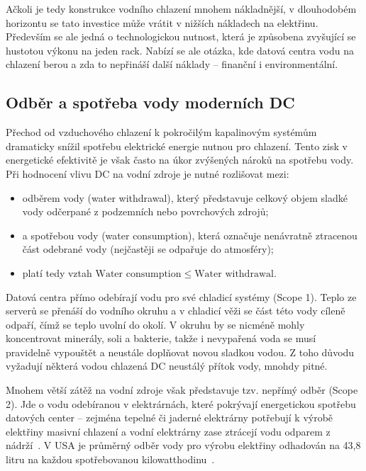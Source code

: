 Ačkoli je tedy konstrukce vodního chlazení mnohem nákladnější, v dlouhodobém horizontu se tato investice může vrátit v nižších nákladech na elektřinu. Především se ale jedná o technologickou nutnost, která je způsobena zvyšující se hustotou výkonu na jeden rack. Nabízí se ale otázka, kde datová centra vodu na chlazení berou a zda to nepřináší další náklady -- finanční i environmentální.

\subsection{Odběr a spotřeba vody moderních DC}
\label{subsec:voda}

Přechod od vzduchového chlazení k pokročilým kapalinovým systémům dramaticky snížil spotřebu elektrické energie nutnou pro chlazení. Tento zisk v energetické efektivitě je však často na úkor zvýšených nároků na spotřebu vody. Při hodnocení vlivu DC na vodní zdroje je nutné rozlišovat mezi:

\begin{itemize}
    \item odběrem vody (water withdrawal), který představuje celkový objem sladké vody odčerpané z podzemních nebo povrchových zdrojů;
    \item a spotřebou vody (water consumption), která označuje nenávratně ztracenou část odebrané vody (nejčastěji se odpařuje do atmosféry);~\cite{li_making_2025}
    \item platí tedy vztah $\text{Water consumption} \le \text{Water withdrawal}.$
\end{itemize}

Datová centra přímo odebírají vodu pro své chladicí systémy (Scope 1). Teplo ze serverů se přenáší do vodního okruhu a v chladicí věži se část této vody cíleně odpaří, čímž se teplo uvolní do okolí. V okruhu by se nicméně mohly koncentrovat minerály, soli a bakterie, takže i nevypařená voda se musí pravidelně vypouštět a neustále doplňovat novou sladkou vodou. Z toho důvodu vyžadují některá vodou chlazená DC neustálý přítok vody, mnohdy pitné.~\cite{li_making_2025}

Mnohem větší zátěž na vodní zdroje však představuje tzv. nepřímý odběr (Scope 2). Jde o vodu odebíranou v elektrárnách, které pokrývají energetickou spotřebu datových center -- zejména tepelné či jaderné elektrárny potřebují k výrobě elektřiny masivní chlazení a vodní elektrárny zase ztrácejí vodu odparem z nádrží~\cite{li_making_2025, LBNL-2001637}. V USA je průměrný odběr vody pro výrobu elektřiny odhadován na 43,8 litru na každou spotřebovanou kilowatthodinu~\cite{li_making_2025}.


